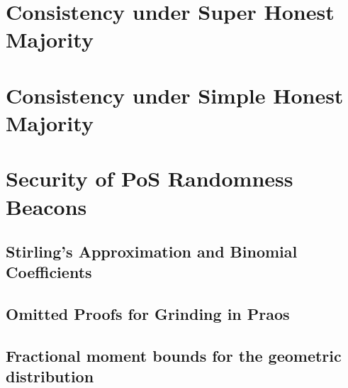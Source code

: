 \documentclass[11pt,oneside]{book}
\begin{document}

\singlespacing

\setcounter{tocdepth}{1}
\tableofcontents

\listoffigures

\listoftables

\thispagestyle{plain}
\mainmatter
\doublespacing





\part{Consistency under Super Honest Majority}


\part{Consistency under Simple Honest Majority}


\part{Security of PoS Randomness Beacons}



\singlespacing
\newpage
{}
  


\appendix
{}

\chapter{Stirling's Approximation and Binomial Coefficients}\label{app:binomial-coeff}


\chapter{Omitted Proofs for Grinding in Praos}\label{app:grinding-praos}


\chapter{Fractional moment bounds for the geometric distribution}\label{app:geometric}

\end{document}
